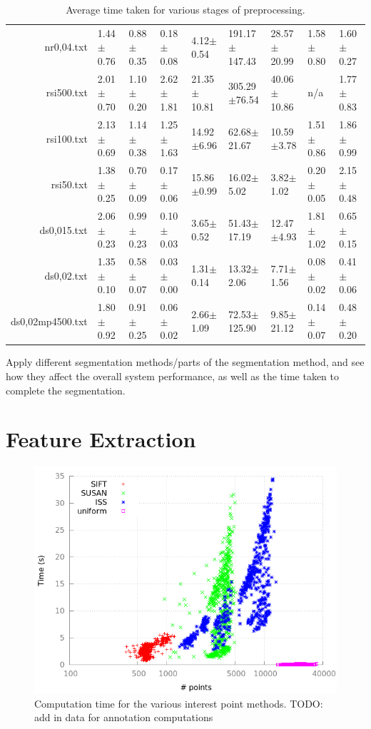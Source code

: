 \documentclass[11pt,a4paper]{kth-mag}
\begin{document}
\begin{landscape}
\begin{table}
\begin{tabular}{r|llllllll}
      nr0,04.txt & 1.44$\pm$0.76 & 0.88$\pm$0.35 & 0.18$\pm$0.08 & 4.12$\pm$0.54 & 191.17$\pm$147.43 & 28.57$\pm$20.99 & 1.58$\pm$0.80 & 1.60$\pm$0.27\\
      rsi500.txt & 2.01$\pm$0.70 & 1.10$\pm$0.20 & 2.62$\pm$1.81 & 21.35$\pm$10.81 & 305.29$\pm$76.54 & 40.06$\pm$10.86 & n/a &1.77$\pm$0.83\\
      rsi100.txt & 2.13$\pm$0.69 & 1.14$\pm$0.38 & 1.25$\pm$1.63 & 14.92$\pm$6.96 & 62.68$\pm$21.67 & 10.59$\pm$3.78 & 1.51$\pm$0.86 & 1.86$\pm$0.99\\
      rsi50.txt & 1.38$\pm$0.25 & 0.70$\pm$0.09 & 0.17$\pm$0.06 & 15.86$\pm$0.99 & 16.02$\pm$5.02 & 3.82$\pm$1.02 & 0.20$\pm$0.05 & 2.15$\pm$0.48\\
      ds0,015.txt & 2.06$\pm$0.23 & 0.99$\pm$0.23 & 0.10$\pm$0.03 & 3.65$\pm$0.52 & 51.43$\pm$17.19 & 12.47$\pm$4.93 & 1.81$\pm$1.02 & 0.65$\pm$0.15\\
      ds0,02.txt & 1.35$\pm$0.10 & 0.58$\pm$0.07 & 0.03$\pm$0.00 & 1.31$\pm$0.14 & 13.32$\pm$2.06 & 7.71$\pm$1.56 & 0.08$\pm$0.02 & 0.41$\pm$0.06\\
      ds0,02mp4500.txt & 1.80$\pm$0.92 & 0.91$\pm$0.25 & 0.06$\pm$0.02 & 2.66$\pm$1.09 & 72.53$\pm$125.90 & 9.85$\pm$21.12 & 0.14$\pm$0.07 & 0.48$\pm$0.20
    \end{tabular}
    \caption{Average time taken for various stages of preprocessing.}
    \label{tbl:preprocess_time}
  \end{table}
\end{landscape}
Apply different segmentation methods/parts of the segmentation method, and see
how they affect the overall system performance, as well as the time taken to
complete the segmentation.
\section{Feature Extraction}
\begin{figure}
  \centering
  \includegraphics[width=\textwidth]{images/interest_agg}
  \caption{Computation time for the various interest point methods. TODO: add in
    data for annotation computations}
  \label{fig:interest_agg}
\end{figure}
\end{document}
